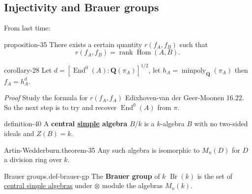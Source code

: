 \documentclass[10pt,]{book}
\makeatletter
\newcommand{\terminology}[1]{\textbf{#1}}
\renewcommand*{\proofname}{Proof}
\renewenvironment{proof}[1][\proofname]{\par
  \pushQED{\qed}%
  \normalfont \topsep6\p@\@plus6\p@\relax
  \trivlist
  \item\relax
    {\itshape
    #1\@addpunct{.}}\hspace\labelsep\ignorespaces
}{%
  \popQED\endtrivlist\@endpefalse
}
\numberwithin{equation}{section}
\newcommand{\lb}{[}
\newcommand{\rb}{]}
\newcommand{\QQ}{\mathbf{Q}}
\DeclareMathOperator{\End}{End}
\DeclareMathOperator{\Hom}{Hom}
\DeclareMathOperator{\rank}{rank}
\makeatother
\begin{document}
\subsection[{Injectivity and Brauer groups}]{Injectivity and Brauer groups}\label{subsection-36}
\hypertarget{p-416}{}%
From last time:%
\begin{proposition}{}{}{proposition-35}%
\hypertarget{p-417}{}%
There exists a certain quantity \(r(f_A, f_B)\) such that%
\begin{equation*}
r(f_A, f_B) = \rank \Hom(A,B)\text{.}
\end{equation*}
%
\end{proposition}
\begin{corollary}{}{}{corollary-28}%
\hypertarget{p-418}{}%
Let \(d = \lb \End^0(A) : \QQ(\pi_A) \rb^{1/2}\), let \(h_A = \operatorname{minpoly}_\QQ(\pi_A)\) then \(f_A = h_A^d\).%
\end{corollary}
\begin{proof}\hypertarget{proof-71}{}
\hypertarget{p-419}{}%
Study the formula for \(r(f_A, f_A)\) Edixhoven-van der Geer-Moonen 16.22.%
\end{proof}
\hypertarget{p-420}{}%
So the next step is to try and recover \(\End^0(A)\) from \(\pi\).%
\begin{definition}{}{definition-40}%
\hypertarget{p-421}{}%
A \terminology{central \hyperref[def-simple-av]{simple} algebra} \(B/k\) is a \(k\)-algebra \(B\) with no two-sided ideals and \(Z(B) = k\).%
\end{definition}
\begin{theorem}{Artin-Wedderburn.}{}{theorem-35}%
\hypertarget{p-422}{}%
Any such algebra is isomorphic to \(M_n(D)\) for \(D\) a division ring over \(k\).%
\end{theorem}
\begin{definition}{Brauer groups.}{def-brauer-gp}%
\hypertarget{p-423}{}%
The \terminology{Brauer group} of \(k\) \(\operatorname{Br}(k)\) is the set of \hyperref[sec-honda-tate]{central \hyperref[def-simple-av]{simple} algebras} under \(\otimes\) module the algebras \(M_n(k)\).%
\end{definition}
\end{document}
